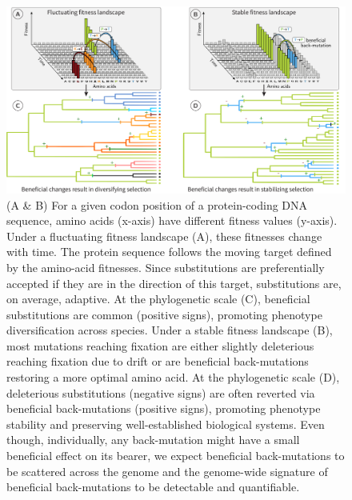 \documentclass{article}
\begin{document}
    \begin{figure}[!ht]
        \centering
        \includegraphics[width=\textwidth, page=1] {artworks/figure.fitness-landscape}
        \caption{
            (A \& B) For a given codon position of a protein-coding DNA sequence, amino acids (x-axis) have different fitness values (y-axis).
            Under a fluctuating fitness landscape (A), these fitnesses change with time.
            The protein sequence follows the moving target defined by the amino-acid fitnesses. Since substitutions are preferentially accepted if they are in the direction of this target, substitutions are, on average, adaptive.
            At the phylogenetic scale (C), beneficial substitutions are common (positive signs), promoting phenotype diversification across species.
            Under a stable fitness landscape (B), most mutations reaching fixation are either slightly deleterious reaching fixation due to drift or are beneficial back-mutations restoring a more optimal amino acid.
            At the phylogenetic scale (D), deleterious substitutions (negative signs) are often reverted via beneficial back-mutations (positive signs), promoting phenotype stability and preserving well-established biological systems.
            Even though, individually, any back-mutation might have a small beneficial effect on its bearer, we expect beneficial back-mutations to be scattered across the genome and the genome-wide signature of beneficial back-mutations to be detectable and quantifiable.}
        \label{fig:fitness-landscape}
    \end{figure}
\end{document}

